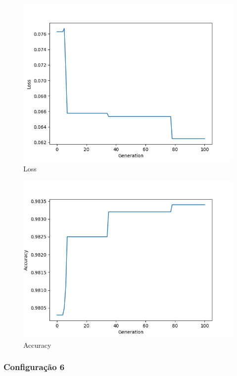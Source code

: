 \documentclass[twoside,conference,a4paper]{IEEEtran}
\begin{document}
\begin{figure}[htbp]
        \centering \includegraphics[width=1\columnwidth]{./ia_proj_images/mnist/5/loss.png}
        \caption{
                \label{fig:loss_mnist_05}
                Loss
        }
\end{figure}
\begin{figure}[htbp]
        \centering \includegraphics[width=1\columnwidth]{./ia_proj_images/mnist/5/acc.png}
        \caption{
                \label{fig:acc_mnist_05}
                Accuracy
        }
\end{figure}

\subsubsection{Configuração 6}
\end{document}
